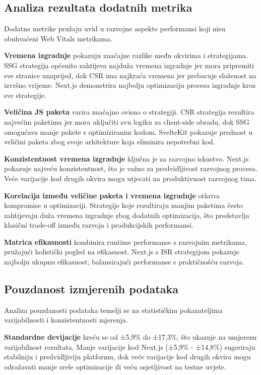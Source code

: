 \subsection{Analiza rezultata dodatnih metrika}

Dodatne metrike pružaju uvid u razvojne aspekte performansi koji nisu obuhvaćeni Web Vitals metrikama.

\textbf{Vremena izgradnje} pokazuju značajne razlike među okvirima i strategijama. SSG strategija općenito zahtijeva najduža vremena izgradnje jer mora pripremiti sve stranice unaprijed, dok CSR ima najkraća vremena jer prebacuje složenost na izvršno vrijeme. Next.js demonstrira najbolju optimizaciju procesa izgradnje kroz sve strategije.

\textbf{Veličina JS paketa} varira značajno ovisno o strategiji. CSR strategija rezultira najvećim paketima jer mora uključiti svu logiku za client-side obradu, dok SSG omogućava manje pakete s optimiziranim kodom. SvelteKit pokazuje prednost u veličini paketa zbog svoje arhitekture koja eliminira nepotrebni kod.

\textbf{Konzistentnost vremena izgradnje} ključna je za razvojno iskustvo. Next.js pokazuje najveću konzistentnost, što je važno za predvidljivost razvojnog procesa. Veće varijacije kod drugih okvira mogu utjecati na produktivnost razvojnog tima.

\textbf{Korelacija između veličine paketa i vremena izgradnje} otkriva kompromise u optimizaciji. Strategije koje rezultiraju manjim paketima često zahtijevaju duža vremena izgradnje zbog dodatnih optimizacija, što predstavlja klasični trade-off između razvoja i produkcijskih performansi.

\textbf{Matrica efikasnosti} kombinira runtime performanse s razvojnim metrikama, pružajući holistički pogled na efikasnost. Next.js s ISR strategijom pokazuje najbolju ukupnu efikasnost, balansirajući performanse s praktičnošću razvoja.

\subsection{Pouzdanost izmjerenih podataka}

Analiza pouzdanosti podataka temelji se na statističkim pokazateljima varijabilnosti i konzistentnosti mjerenja.

\textbf{Standardne devijacije} kreću se od ±5,9\% do ±17,3\%, što ukazuje na umjerenu varijabilnost rezultata. Manje varijacije kod Next.js (±5,9\% - ±14,8\%) sugeriraju stabilniju i predvidljiviju platformu, dok veće varijacije kod drugih okvira mogu odražavati manje zrele optimizacije ili veću osjetljivost na testne uvjete.

